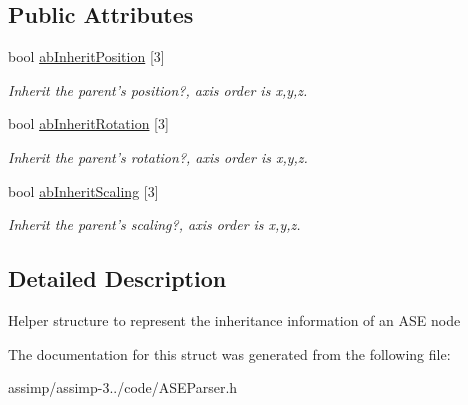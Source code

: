 \subsection*{Public Attributes}
\begin{DoxyCompactItemize}
\item 
\hypertarget{struct_assimp_1_1_a_s_e_1_1_inheritance_info_a238c5b2af18a7f2f9be0d2c160d2ba72}{bool \hyperlink{struct_assimp_1_1_a_s_e_1_1_inheritance_info_a238c5b2af18a7f2f9be0d2c160d2ba72}{ab\+Inherit\+Position} \mbox{[}3\mbox{]}}\label{struct_assimp_1_1_a_s_e_1_1_inheritance_info_a238c5b2af18a7f2f9be0d2c160d2ba72}

\begin{DoxyCompactList}\small\item\em Inherit the parent's position?, axis order is x,y,z. \end{DoxyCompactList}\item 
\hypertarget{struct_assimp_1_1_a_s_e_1_1_inheritance_info_a0d73e496dc73886417033483886301fd}{bool \hyperlink{struct_assimp_1_1_a_s_e_1_1_inheritance_info_a0d73e496dc73886417033483886301fd}{ab\+Inherit\+Rotation} \mbox{[}3\mbox{]}}\label{struct_assimp_1_1_a_s_e_1_1_inheritance_info_a0d73e496dc73886417033483886301fd}

\begin{DoxyCompactList}\small\item\em Inherit the parent's rotation?, axis order is x,y,z. \end{DoxyCompactList}\item 
\hypertarget{struct_assimp_1_1_a_s_e_1_1_inheritance_info_aa0d917ae787156c122e7d0b95b9148d8}{bool \hyperlink{struct_assimp_1_1_a_s_e_1_1_inheritance_info_aa0d917ae787156c122e7d0b95b9148d8}{ab\+Inherit\+Scaling} \mbox{[}3\mbox{]}}\label{struct_assimp_1_1_a_s_e_1_1_inheritance_info_aa0d917ae787156c122e7d0b95b9148d8}

\begin{DoxyCompactList}\small\item\em Inherit the parent's scaling?, axis order is x,y,z. \end{DoxyCompactList}\end{DoxyCompactItemize}


\subsection{Detailed Description}
Helper structure to represent the inheritance information of an A\+S\+E node 

The documentation for this struct was generated from the following file\+:\begin{DoxyCompactItemize}
\item 
assimp/assimp-\/3../code/A\+S\+E\+Parser.\+h\end{DoxyCompactItemize}
